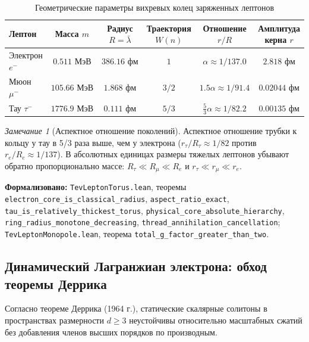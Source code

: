 \documentclass[11pt,a4paper]{article}
\providecommand{\lambdabar}{\bar{\lambda}}
\theoremstyle{definition}
\theoremstyle{remark}
\newtheorem{remark}{Замечание}
\begin{document}
\begin{table}[htbp]
\centering
\small
\setlength{\tabcolsep}{6pt}
\caption{Геометрические параметры вихревых колец заряженных лептонов}
\label{tab:lepton_torus_dimensions}
\vspace{2mm}
\begin{tabular}{lccccc}
\toprule
Лептон & Масса $m$ & Радиус $R = \lambdabar$ & Траектория $W(n)$ & Отношение $r/R$ & Амплитуда керна $r$ \\
\midrule
Электрон $e^-$ & $0.511\text{ МэВ}$ & $386.16\text{ фм}$ & $1$ & $\alpha \approx 1/137.0$ & $2.818\text{ фм}$ \\
Мюон $\mu^-$ & $105.66\text{ МэВ}$ & $1.868\text{ фм}$ & $3/2$ & $1.5\alpha \approx 1/91.4$ & $0.02044\text{ фм}$ \\
Тау $\tau^-$ & $1776.9\text{ МэВ}$ & $0.111\text{ фм}$ & $5/3$ & $\frac{5}{3}\alpha \approx 1/82.2$ & $0.00135\text{ фм}$ \\
\bottomrule
\end{tabular}
\end{table}
	
\begin{remark}[Аспектное отношение поколений]
Аспектное отношение трубки к кольцу у тау в 5/3 раза выше, чем у электрона ($r_\tau / R_\tau \approx 1/82$ против $r_e / R_e \approx 1/137$). В абсолютных единицах размеры тяжелых лептонов убывают обратно пропорционально массе: $R_\tau \ll R_\mu \ll R_e$ и $r_\tau \ll r_\mu \ll r_e$.
\end{remark}

\noindent\small\textbf{Формализовано:} \texttt{TevLeptonTorus.lean}, теоремы \texttt{electron_core_is_classical_radius}, \texttt{aspect_ratio_exact}, \texttt{tau_is_relatively_thickest_torus}, \texttt{physical_core_absolute_hierarchy}, \texttt{ring\_radius\_monotone\_decreasing}, \texttt{thread\_annihilation\_cancellation};\\ \texttt{TevLeptonMonopole.lean}, теорема \texttt{total_g_factor_greater_than_two}.

\subsection{Динамический Лагранжиан электрона: обход теоремы Деррика}
	
Согласно теореме Деррика (1964 г.), статические скалярные солитоны в пространствах размерности $d \ge 3$ неустойчивы относительно масштабных сжатий без добавления членов высших порядков по производным.
	
\end{document}
